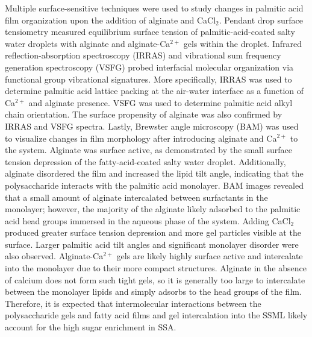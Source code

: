 \documentclass[11pt]{article}
\begin{document}
Multiple surface-sensitive techniques were used to study changes in palmitic acid film organization upon the addition of alginate and CaCl$_2$. Pendant drop surface tensiometry measured equilibrium surface tension of palmitic-acid-coated salty water droplets with alginate and alginate-Ca$^{2+}$ gels within the droplet. Infrared reflection-absorption spectroscopy (IRRAS) and vibrational sum frequency generation spectroscopy (VSFG) probed interfacial molecular organization via functional group vibrational signatures. More specifically, IRRAS was used to determine palmitic acid lattice packing at the air-water interface as a function of Ca$^{2+}$ and alginate presence.\cite{adamsSodiumCarboxylateContact2017} VSFG was used to determine palmitic acid alkyl chain orientation.\cite{adamsSodiumCarboxylateContact2017} The surface propensity of alginate was also confirmed by IRRAS and VSFG spectra. Lastly, Brewster angle microscopy (BAM) was used to visualize changes in film morphology after introducing alginate and Ca$^{2+}$ to the system.\cite{ruddThermodynamicNonequilibriumStability2018} Alginate was surface active, as demonstrated by the small surface tension depression of the fatty-acid-coated salty water droplet. Additionally, alginate disordered the film and increased the lipid tilt angle, indicating that the polysaccharide interacts with the palmitic acid monolayer. BAM images revealed that a small amount of alginate intercalated between surfactants in the monolayer; however, the majority of the alginate likely adsorbed to the palmitic acid head groups immersed in the aqueous phase of the system. Adding CaCl$_2$ produced greater surface tension depression and more gel particles visible at the surface. Larger palmitic acid tilt angles and significant monolayer disorder were also observed. Alginate-Ca$^{2+}$ gels are likely highly surface active and intercalate into the monolayer due to their more compact structures. Alginate in the absence of calcium does not form such tight gels, so it is generally too large to intercalate between the monolayer lipids and simply adsorbs to the head groups of the film. Therefore, it is expected that intermolecular interactions between the polysaccharide gels and fatty acid films and gel intercalation into the SSML likely account for the high sugar enrichment in SSA. \par
\end{document}
